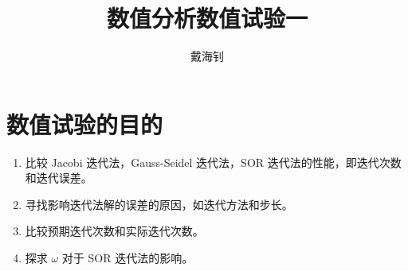 \documentclass{article}
\title{数值分析数值试验一}
\author{戴海钊\quad 2019533084}
\begin{document}
\maketitle

\section{数值试验的目的}
\begin{enumerate}
    \item 比较 Jacobi 迭代法，Gauss-Seidel 迭代法，SOR 迭代法的性能，即迭代次数和迭代误差。
    \item 寻找影响迭代法解的误差的原因，如迭代方法和步长。
    \item 比较预期迭代次数和实际迭代次数。
    \item 探求 $\omega$ 对于 SOR 迭代法的影响。
\end{enumerate}
\end{document}
